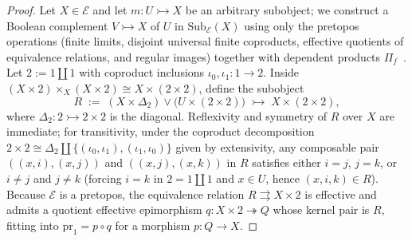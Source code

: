 \documentclass[10pt,twoside,openright]{book}
\theoremstyle{crmplain}
\theoremstyle{crmdef}
\theoremstyle{crmremark}
\begin{document}
\begin{proof}
Let $X \in \mathcal{E}$ and let $m : U \rightarrowtail X$ be an arbitrary subobject; we construct a Boolean complement $V \rightarrowtail X$ of $U$ in $\mathrm{Sub}_{\mathcal{E}}(X)$ using only the pretopos operations (finite limits, disjoint universal finite coproducts, effective quotients of equivalence relations, and regular images) together with dependent products $\Pi_f$~\cite{Diaconescu75,Johnstone02,Maietti05}. Let $2 := 1 \amalg 1$ with coproduct inclusions $\iota_0, \iota_1 : 1 \to 2$. Inside $(X \times 2) \times_X (X \times 2) \cong X \times (2 \times 2)$, define the subobject
\[
  R \;:=\; (X \times \Delta_2) \vee \bigl(U \times (2 \times 2)\bigr) \;\rightarrowtail\; X \times (2 \times 2),
\]
where $\Delta_2 : 2 \rightarrowtail 2 \times 2$ is the diagonal. Reflexivity and symmetry of $R$ over $X$ are immediate; for transitivity, under the coproduct decomposition $2 \times 2 \cong \Delta_2 \amalg \{(\iota_0,\iota_1), (\iota_1,\iota_0)\}$ given by extensivity, any composable pair $((x,i),(x,j))$ and $((x,j),(x,k))$ in $R$ satisfies either $i=j$, $j=k$, or $i \neq j$ and $j \neq k$ (forcing $i = k$ in $2 = 1 \amalg 1$ and $x \in U$, hence $(x,i,k) \in R$). Because $\mathcal{E}$ is a pretopos, the equivalence relation $R \rightrightarrows X \times 2$ is effective and admits a quotient effective epimorphism $q : X \times 2 \twoheadrightarrow Q$ whose kernel pair is $R$, fitting into $\mathrm{pr}_1 = p \circ q$ for a morphism $p : Q \to X$.


\end{proof}
\end{document}
